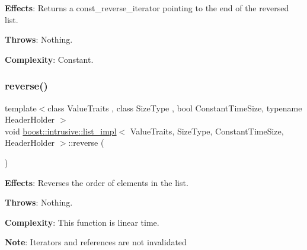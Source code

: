 {\bfseries Effects}\+: Returns a const\+\_\+reverse\+\_\+iterator pointing to the end of the reversed list.

{\bfseries Throws}\+: Nothing.

{\bfseries Complexity}\+: Constant. \mbox{\label{classboost_1_1intrusive_1_1list__impl_a09ad4e2d3e2561d0cfe1be3ab7601b9c}} 
\subsubsection{\texorpdfstring{reverse()}{reverse()}}
{\footnotesize\ttfamily template$<$class Value\+Traits , class Size\+Type , bool Constant\+Time\+Size, typename Header\+Holder $>$ \\
void \hyperlink{classboost_1_1intrusive_1_1list__impl}{boost\+::intrusive\+::list\+\_\+impl}$<$ Value\+Traits, Size\+Type, Constant\+Time\+Size, Header\+Holder $>$\+::reverse (\begin{DoxyParamCaption}{ }\end{DoxyParamCaption})\hspace{0.3cm}{\ttfamily [inline]}}

{\bfseries Effects}\+: Reverses the order of elements in the list.

{\bfseries Throws}\+: Nothing.

{\bfseries Complexity}\+: This function is linear time.

{\bfseries Note}\+: Iterators and references are not invalidated \mbox{\label{classboost_1_1intrusive_1_1list__impl_aa6f586f577be78dc3acf107cd4b92d29}} 
